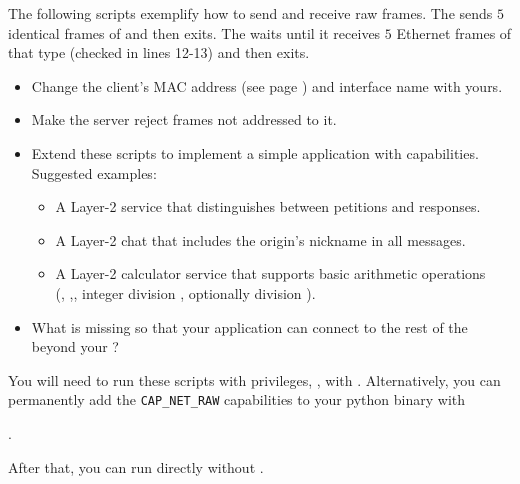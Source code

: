 \begin{exercise}
The following scripts exemplify how to send and receive raw  frames. 
The  sends $5$ identical frames of   and then exits.
The  waits until it receives $5$ Ethernet frames of that type (checked in lines 12-13) and then exits.
% 
\begin{itemize}
\item Change the client's MAC address (see page \pageref{sec:layer2:practical}) and interface name with yours.
\item Make the server reject frames not addressed to it.
\item Extend these scripts to implement a simple application with  capabilities.\\
  Suggested examples:
    \begin{itemize}
    \item A Layer-2  service that distinguishes between petitions and responses.
    \item A Layer-2  chat that includes the origin's nickname in all messages.
    \item A Layer-2 calculator service that supports basic arithmetic operations\\
      (\inlineCode{+}, \inlineCode{-},\inlineCode{*}, integer division \inlineCode{//}, optionally division \inlineCode{/}).
    \end{itemize}
\item What is missing so that your application can connect to the rest of the  beyond your ?
\end{itemize}

\begin{remark}
You will need to run these scripts with privileges, \eg, with .
% 
Alternatively, you can permanently add the \texttt{CAP\_NET\_RAW} capabilities
to your python binary with
\begin{center}
.  
\end{center}
% 
After that, you can run  directly without .\\[-0.5cm]
\end{remark}
\label{ex:layer2:echo}
\end{exercise}

\begin{center}
\end{center}

\begin{center}
\end{center}
